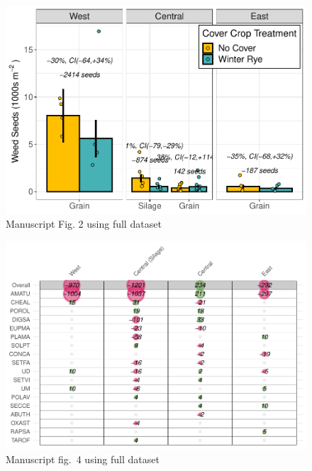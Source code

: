 \documentclass[
]{article}
\begin{document}
\begin{figure}
\centering
\includegraphics{supp-mat_files/figure-latex/bargraph-1.pdf}
\caption{Manuscript Fig. 2 using full dataset}
\end{figure}

\begin{figure}
\centering
\includegraphics{supp-mat_files/figure-latex/dotplot-1.pdf}
\caption{Manuscript fig.~4 using full dataset}
\end{figure}

\newpage
\end{document}
